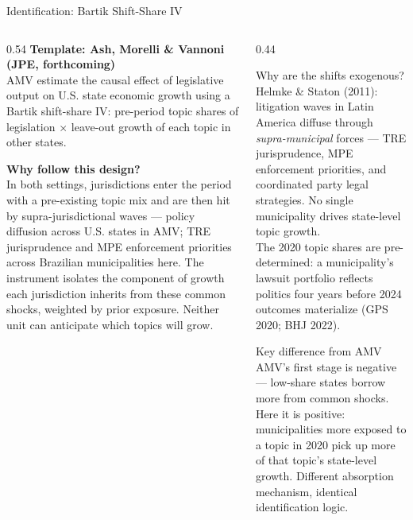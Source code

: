 \documentclass[aspectratio=169,10pt]{beamer}
\begin{document}
\begin{frame}{Identification: Bartik Shift-Share IV}
\begin{columns}[T]
\begin{column}{0.54\textwidth}
\textbf{Template: Ash, Morelli \& Vannoni (JPE, forthcoming)}\\[2pt]
AMV estimate the causal effect of legislative output on U.S. state economic growth using a Bartik shift-share IV: pre-period topic shares of legislation $\times$ leave-out growth of each topic in other states.
\smallskip

\textbf{Why follow this design?}\\[2pt]
In both settings, jurisdictions enter the period with a pre-existing topic mix and are then hit by supra-jurisdictional waves --- policy diffusion across U.S. states in AMV; TRE jurisprudence and MPE enforcement priorities across Brazilian municipalities here. The instrument isolates the component of growth each jurisdiction inherits from these common shocks, weighted by prior exposure. Neither unit can anticipate which topics will grow.
\end{column}
\begin{column}{0.44\textwidth}
\begin{alertblock}{Why are the shifts exogenous?}
  \footnotesize
  Helmke \& Staton (2011): litigation waves in Latin America diffuse through \emph{supra-municipal} forces --- TRE jurisprudence, MPE enforcement priorities, and coordinated party legal strategies. No single municipality drives state-level topic growth.\\[3pt]
  The 2020 topic shares are pre-determined: a municipality's lawsuit portfolio reflects politics four years before 2024 outcomes materialize (GPS 2020; BHJ 2022).
\end{alertblock}
\smallskip
\begin{block}{Key difference from AMV}
  \footnotesize
  AMV's first stage is negative --- low-share states borrow more from common shocks. Here it is positive: municipalities more exposed to a topic in 2020 pick up more of that topic's state-level growth. Different absorption mechanism, identical identification logic.
\end{block}
\end{column}
\end{columns}
\end{frame}
\end{document}
